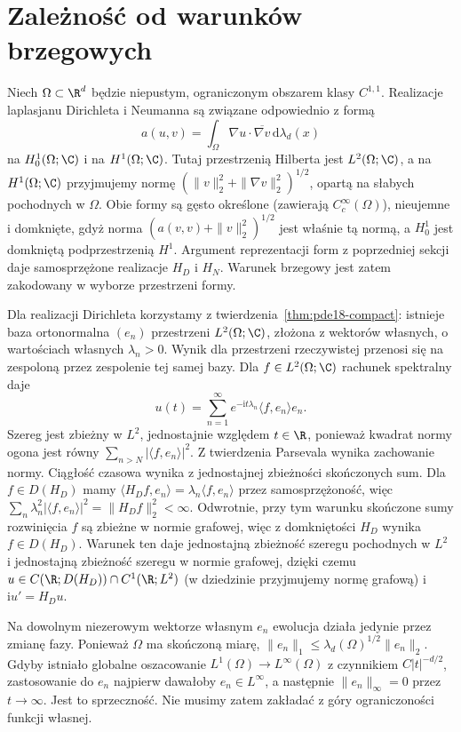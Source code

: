 \section{Zależność od warunków brzegowych}
Niech $\Omega\subset\R^d$ będzie niepustym,
ograniczonym obszarem klasy $C^{1,1}$.
Realizacje laplasjanu Dirichleta i Neumanna
są związane odpowiednio z formą
\[
 a(u,v)=\int_\Omega\nabla u\cdot\overline{\nabla v}
               \,\mathrm d\lambda_d(x)
\]
na $H_0^1(\Omega;\C)$ i na $H^1(\Omega;\C)$.
Tutaj przestrzenią Hilberta jest $L^2(\Omega;\C)$,
a na $H^1(\Omega;\C)$ przyjmujemy normę
$(\|v\|_2^2+\|\nabla v\|_2^2)^{1/2}$,
opartą na słabych pochodnych w $\Omega$.
Obie formy są gęsto określone (zawierają
$C_c^\infty(\Omega)$), nieujemne i domknięte,
gdyż norma $(a(v,v)+\|v\|_2^2)^{1/2}$ jest
właśnie tą normą, a $H_0^1$ jest domkniętą
podprzestrzenią $H^1$.
Argument reprezentacji form z poprzedniej sekcji
daje samosprzężone realizacje $H_D$ i $H_N$.
Warunek brzegowy jest zatem zakodowany
w wyborze przestrzeni formy.

Dla realizacji Dirichleta korzystamy
z twierdzenia~\ref{thm:pde18-compact}:
istnieje baza ortonormalna $(e_n)$ przestrzeni
$L^2(\Omega;\C)$, złożona z wektorów własnych,
o wartościach własnych $\lambda_n>0$.
Wynik dla przestrzeni rzeczywistej przenosi się
na zespoloną przez zespolenie tej samej bazy.
Dla $f\in L^2(\Omega;\C)$ rachunek spektralny daje
\[
 u(t)=\sum_{n=1}^\infty e^{-\mathrm it\lambda_n}
                    \langle f,e_n\rangle e_n .
\]
Szereg jest zbieżny w $L^2$, jednostajnie
względem $t\in\R$, ponieważ kwadrat normy
ogona jest równy $\sum_{n>N}|\langle f,e_n\rangle|^2$.
Z twierdzenia Parsevala wynika zachowanie normy.
Ciągłość czasowa wynika z jednostajnej zbieżności
skończonych sum. Dla $f\in D(H_D)$ mamy
$\langle H_Df,e_n\rangle=\lambda_n\langle f,e_n\rangle$
przez samosprzężoność, więc
$\sum_n\lambda_n^2|\langle f,e_n\rangle|^2
=\|H_Df\|_2^2<\infty$.
Odwrotnie, przy tym warunku skończone sumy
rozwinięcia $f$ są zbieżne w normie grafowej,
więc z domkniętości $H_D$ wynika $f\in D(H_D)$.
Warunek ten daje jednostajną zbieżność szeregu
pochodnych w $L^2$ i jednostajną zbieżność
szeregu w normie grafowej, dzięki czemu
$u\in C(\R;D(H_D))\cap C^1(\R;L^2)$
(w dziedzinie przyjmujemy normę grafową)
i $\mathrm iu'=H_Du$.

Na dowolnym niezerowym wektorze własnym
$e_n$ ewolucja działa jedynie przez zmianę fazy.
Ponieważ $\Omega$ ma skończoną miarę,
$\|e_n\|_1\le\lambda_d(\Omega)^{1/2}\|e_n\|_2$.
Gdyby istniało globalne oszacowanie
$L^1(\Omega)\to L^\infty(\Omega)$ z czynnikiem
$C|t|^{-d/2}$, zastosowanie do $e_n$ najpierw
dawałoby $e_n\in L^\infty$, a następnie
$\|e_n\|_\infty=0$ przez $t\to\infty$.
Jest to sprzeczność. Nie musimy zatem zakładać
z góry ograniczoności funkcji własnej.

